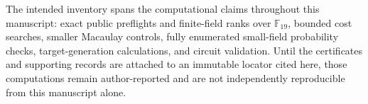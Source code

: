 \documentclass[11pt]{article}
\newcommand{\F}{\mathbb F}
\begin{document}
The intended inventory spans the computational claims throughout this
manuscript: exact public preflights and finite-field ranks over $\F_{19}$,
bounded cost searches, smaller Macaulay controls, fully enumerated small-field
probability checks, target-generation calculations, and circuit validation.
Until the certificates and supporting records are attached to an immutable
locator cited here, those computations remain author-reported and are not
independently reproducible from this manuscript alone.

\begingroup
\footnotesize
\printbibliography
\endgroup
\end{document}
